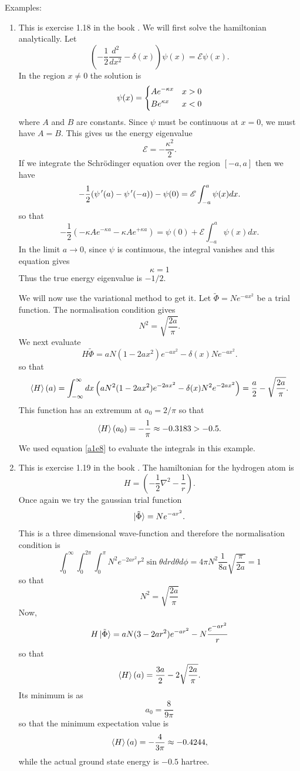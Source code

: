 Examples:
\begin{enumerate}
\item This is exercise 1.18 in the book \cite{so1989}. We will first solve
the hamiltonian analytically. Let
\[
\left(-\frac{1}{2}\frac{d^2}{dx^2} - \delta(x)\right)\psi(x)=\mathscr{E}\psi(x).
\]
In the region $x \ne 0$ the solution is
\[
\psi(x)=\begin{dcases}Ae^{-\kappa x} & x > 0 \\Be^{\kappa x} & x < 0\end{dcases}
\]
where $A$ and $B$ are constants. Since $\psi$ must be continuous at $x = 0$,
we must have $A = B$. This gives us the energy eigenvalue
\[
\mathscr{E} = -\frac{\kappa^2}{2}.
\]
If we integrate the Schr\"{o}dinger equation over the region $[-a, a]$ then
we have
\[
-\frac{1}{2}(\psi^{\,\prime}(a) - \psi^{\,\prime}(-a)) - \psi(0) = \mathscr{E}
\int_{-a}^a\psi(x)dx.
\]
so that
\[
-\frac{1}{2}(-\kappa A e^{-\kappa a} - \kappa A e^{+\kappa a}) = 
\psi(0) + \mathscr{E}\int_{-a}^a\psi(x)dx.
\]
In the limit $a \rightarrow 0$, since $\psi$ is continuous, the integral 
vanishes and this equation gives
\[
\kappa = 1
\]
Thus the true energy eigenvalue is $-1/2$.

We will now use the variational method to get it. Let $\tilde{\Phi} = Ne^{-ax^2}$
be a trial function. The normalisation condition gives 
\[
N^2 = \sqrt{\frac{2a}{\pi}}.
\]
We next evaluate
\[
H\tilde{\Phi} = aN(1 - 2ax^2)e^{-ax^2} - \delta(x)Ne^{-ax^2}.
\]
so that
\[
\braket{H}(a) = \int_{-\infty}^\infty dx\left(aN^2(1 - 2ax^2)e^{-2ax^2} - 
\delta(x)N^2 e^{-2ax^2}\right) = \frac{a}{2} - \sqrt{\frac{2a}{\pi}}.
\]
This function has an extremum at $a_0 = 2/\pi$ so that
\[
\braket{H}(a_0) = -\frac{1}{\pi} \approx -0.3183 > -0.5.
\]
We used equation \eqref{a1e8} to evaluate the integrals in this example.

\item This is exercise 1.19 in the book \cite{so1989}. The hamiltonian for the
hydrogen atom is
\[
H = \left(-\frac{1}{2}\nabla^2 - \frac{1}{r}\right).
\]
Once again we try the gaussian trial function
\[
\ket{\tilde{\Phi}} = Ne^{-ar^2}.
\]
This is a three dimensional wave-function and therefore the normalisation
condition is
\[
\int_0^\infty\int_0^{2\pi}\int_0^\pi N^2 e^{-2ar^2}r^2\sin\theta drd\theta d\phi
= 4\pi N^2 \frac{1}{8a}\sqrt{\frac{\pi}{2a}} = 1
\]
so that
\[
N^2 = \sqrt{\frac{2a}{\pi}}
\]
Now,
\[
H\ket{\tilde{\Phi}} = aN(3 - 2ar^2)e^{-ar^2} - N\frac{e^{-ar^2}}{r}
\]
so that
\[
\braket{H}(a) = \frac{3a}{2} - 2\sqrt{\frac{2a}{\pi}}.
\]
Its minimum is as 
\[
a_0 = \frac{8}{9\pi}
\]
so that the minimum expectation value is
\[
\braket{H}(a) = -\frac{4}{3\pi} \approx -0.4244,
\]
while the actual ground state energy is $-0.5$ hartree.
\end{enumerate}

